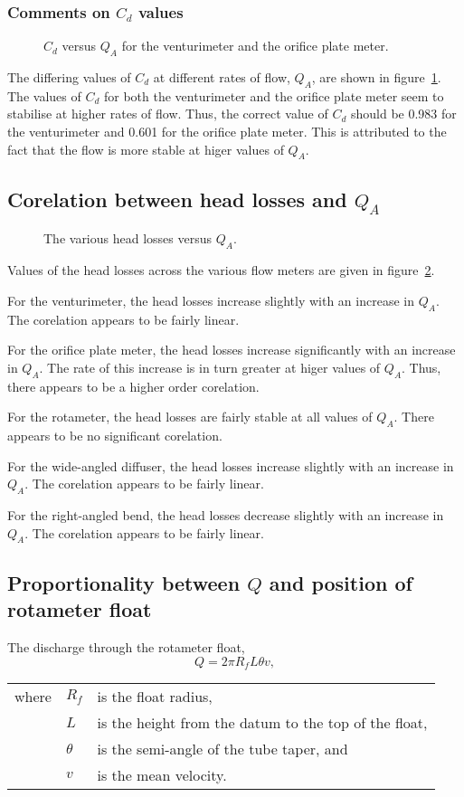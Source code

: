 \documentclass[a4paper]{article}
\begin{document}
\subsubsection{Comments on $C_d$ values}
\begin{figure}[htbp]
\centering

\caption{$C_d$ versus $Q_A$ for the venturimeter and the orifice plate meter.}
\label{fig:cd-qa}
\end{figure}
The differing values of $C_d$ at different rates of flow, $Q_A$, 
are shown in figure~\ref{fig:cd-qa}. The values of $C_d$ for both
the venturimeter and the orifice plate meter seem to stabilise
at higher rates of flow. Thus, the correct value of $C_d$ 
should be 0.983 for the venturimeter and 
0.601 for the orifice plate meter. This is attributed to the fact that
the flow is more stable at higer values of $Q_A$. 

\subsection{Corelation between head losses and $Q_A$}
\begin{figure}[htbp]
\centering

\caption{The various head losses versus $Q_A$.}
\label{fig:head-losses-qa}
\end{figure}
Values of the head losses across the various flow meters are given in
figure~\ref{fig:head-losses-qa}.

For the venturimeter, the head losses increase slightly with
an increase in $Q_A$. The corelation appears to be fairly linear.

For the orifice plate meter, the head losses increase significantly with
an increase in $Q_A$. The rate of this increase is in turn greater
at higer values of $Q_A$. Thus, there appears to be a higher order corelation.

For the rotameter, the head losses are fairly stable at all values of $Q_A$.
There appears to be no significant corelation.

For the wide-angled diffuser, the head losses increase slightly with
an increase in $Q_A$. The corelation appears to be fairly linear.

For the right-angled bend, the head losses decrease slightly with
an increase in $Q_A$. The corelation appears to be fairly linear.

\subsection{Proportionality between $Q$ and position of rotameter float}
The discharge through the rotameter float,
\begin{equation}
\label{eq:rotameter-discharge}
Q = 2\pi R_f L \theta v,
\end{equation}
\begin{tabular}{rll}
where &$R_f$& is the float radius, \\
      &$L$& is the height from the datum to the top of the float, \\
      &$\theta$& is the semi-angle of the tube taper, and \\
      &$v$& is the mean velocity. \\
\end{tabular}
\end{document}
